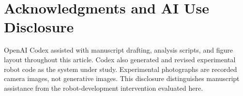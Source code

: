 \section*{Acknowledgments and AI Use Disclosure}
OpenAI Codex assisted with manuscript drafting, analysis scripts, and figure
layout throughout this article. Codex also generated and revised experimental
robot code as the system under study. Experimental photographs are recorded
camera images, not generative images. This disclosure distinguishes manuscript
assistance from the robot-development intervention evaluated here.
